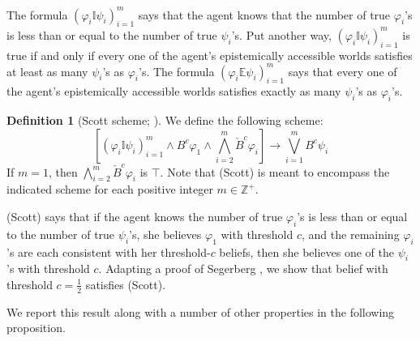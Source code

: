 \documentclass[12pt]{article}
\theoremstyle{definition}
\newtheorem{definition}[theorem]{Definition}
\newcommand{\Int}{\mathbb{Z}}  %
\begin{document}
The formula $(\varphi_i\mathbb{I}\psi_i)_{i=1}^m$ says that the agent
knows that the number of true $\varphi_i$'s is less than or equal to the
number of true $\psi_i$'s.  Put another way,
$(\varphi_i\mathbb{I}\psi_i)_{i=1}^m$ is true if and only if every one of
the agent's epistemically accessible worlds satisfies at least as many
$\psi_i$'s as $\varphi_i$'s.  The formula
$(\varphi_i\mathbb{E}\psi_i)_{i=1}^m$ says that every one of the agent's
epistemically accessible worlds satisfies exactly as many $\psi_i$'s
as $\varphi_i$'s.

\begin{definition}[Scott scheme; \cite{Sco64:JMP}]
  \label{definition:scott-schemes}
  We define the following scheme:
  \begin{equation}\tag{Scott}
    \textstyle [
    (\varphi_i\mathbb{I}\psi_i)_{i=1}^m
    \land B^c \varphi_1 \land \bigwedge_{i=2}^m \check B^c \varphi_i] \to
    \bigvee_{i=1}^m B^c\psi_i
  \end{equation}
  If $m=1$, then $\bigwedge_{i=2}^m \check B^c\varphi_i$ is $\top$.  Note
  that (Scott) is meant to encompass the indicated scheme for each
  positive integer $m\in\Int^+$.
\end{definition}

(Scott) says that if the agent knows the number of true $\varphi_i$'s is
less than or equal to the number of true $\psi_i$'s, she believes
$\varphi_1$ with threshold $c$, and the remaining $\varphi_i$'s are each
consistent with her threshold-$c$ beliefs, then she believes one of
the $\psi_i$'s with threshold $c$.  Adapting a proof of Segerberg
\cite{Segerberg1971:qpiams}, we show that belief with threshold
$c=\frac12$ satisfies (Scott).

We report this result along with a number of other properties
in the following proposition.
\end{document}
